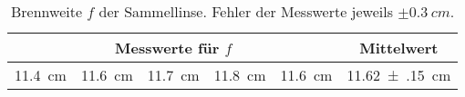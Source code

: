 \documentclass[ngerman,pstricks,border=12pt]{standalone}
\begin{document}
\setcounter{table}{2}
\begin{table}
\centering
\begin{tabular}{c c c c c | c}
		\multicolumn{5}{c|}{Messwerte für $f$} & Mittelwert \\ \hline
		\SI{11.4}{cm} & \SI{11.6}{cm} & \SI{11.7}{cm} & \SI{11.8}{cm} & \SI{11.6}{cm} & \SI{11.62(15)}{cm}
\end{tabular}
\caption{Brennweite $f$ der Sammellinse. Fehler der Messwerte jeweils $\pm\SI{0.3}{cm}$.}
\label{tab:brenn}
\end{table}
\end{document}

